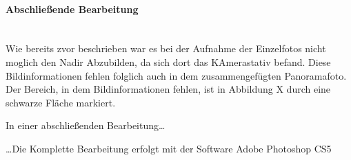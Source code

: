 \paragraph{Abschließende Bearbeitung} \hfill \\

Wie bereits zvor beschrieben war es bei der Aufnahme der Einzelfotos nicht
moglich den Nadir Abzubilden, da sich dort das KAmerastativ befand. Diese
Bildinformationen fehlen folglich auch in dem zusammengefügten Panoramafoto. Der
Bereich, in dem Bildinformationen fehlen, ist in Abbildung X
durch eine schwarze Fläche markiert.

In einer abschließenden Bearbeitung\ldots

\ldots Die Komplette Bearbeitung erfolgt mit der Software Adobe Photoshop CS5
